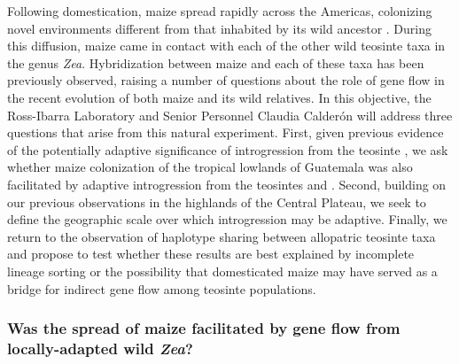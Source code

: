 Following domestication, maize spread rapidly across the Americas, colonizing novel environments different from that inhabited by its wild ancestor \zp. 
During this diffusion, maize came in contact with each of the other wild teosinte taxa in the genus \emph{Zea}.  
Hybridization between maize and each of these taxa has been previously observed, raising a number of questions about the role of gene flow in the recent evolution of both maize and its wild relatives.
In this objective, the Ross-Ibarra Laboratory and Senior Personnel Claudia Calder\'{o}n will address three questions that arise from this natural experiment.  
First, given previous evidence of the potentially adaptive significance of introgression from the teosinte \zm, we ask whether maize colonization of the tropical lowlands of Guatemala was also facilitated by adaptive introgression from the teosintes \zl{} and \zh.
Second, building on our previous observations in the highlands of the Central Plateau, we seek to define the geographic scale over which introgression may be adaptive.
Finally, we return to the observation of haplotype sharing between allopatric teosinte taxa \citep{Ross-Ibarra2009a} and propose to test whether these results are best explained by incomplete lineage sorting or the possibility that domesticated maize may have served as a bridge for indirect gene flow among teosinte populations. 

\subsubsection{Was the spread of maize facilitated by gene flow from locally-adapted wild \emph{Zea}?}
\label{sss:adaptive_intro}

